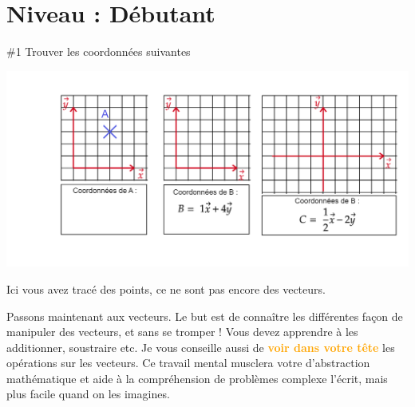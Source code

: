 \documentclass[12pt]{article}
\begin{document}
\section{Niveau : Débutant}

\begin{problem}{\#1 Trouver les coordonnées suivantes}
    
        \begin{center}
            \includegraphics[width=1\textwidth]{DD1.png}
        \end{center}
    
    
Ici vous avez tracé des points, ce ne sont pas encore des vecteurs. 
\end{problem}

\noindent
Passons maintenant aux vecteurs. Le but est de connaître les différentes façon de manipuler des vecteurs, et sans se tromper ! Vous devez apprendre à les additionner, soustraire etc. Je vous conseille aussi de  \textcolor{orange}{\textbf{voir dans votre tête}} les opérations sur les vecteurs. Ce travail mental musclera votre d'abstraction mathématique et aide à la compréhension de problèmes complexe l'écrit, mais plus facile quand on les imagines.\\
\end{document}

